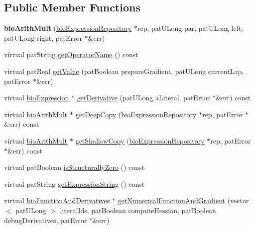 \subsection*{Public Member Functions}
\begin{DoxyCompactItemize}
\item 
\mbox{\label{classbio_arith_mult_ac3da725646bfbd4e8de4332e2d06445e}} 
{\bfseries bio\+Arith\+Mult} (\hyperlink{classbio_expression_repository}{bio\+Expression\+Repository} $\ast$rep, pat\+U\+Long par, pat\+U\+Long left, pat\+U\+Long right, pat\+Error $\ast$\&err)
\item 
virtual pat\+String \hyperlink{classbio_arith_mult_aff182437fd5a1259cbc79fc7f8bc4956}{get\+Operator\+Name} () const
\item 
virtual pat\+Real \hyperlink{classbio_arith_mult_a5f0d4c6fe299be5b88cbcab100def6c9}{get\+Value} (pat\+Boolean prepare\+Gradient, pat\+U\+Long current\+Lap, pat\+Error $\ast$\&err)
\item 
virtual \hyperlink{classbio_expression}{bio\+Expression} $\ast$ \hyperlink{classbio_arith_mult_a77183d650695b163328878a88fcb02a7}{get\+Derivative} (pat\+U\+Long a\+Literal, pat\+Error $\ast$\&err) const
\item 
virtual \hyperlink{classbio_arith_mult}{bio\+Arith\+Mult} $\ast$ \hyperlink{classbio_arith_mult_a1b6b5a5ce5e104bf5a69010ad67ecd11}{get\+Deep\+Copy} (\hyperlink{classbio_expression_repository}{bio\+Expression\+Repository} $\ast$rep, pat\+Error $\ast$\&err) const
\item 
virtual \hyperlink{classbio_arith_mult}{bio\+Arith\+Mult} $\ast$ \hyperlink{classbio_arith_mult_a58d1f8dec3f450d17bbdfe4f98b18c19}{get\+Shallow\+Copy} (\hyperlink{classbio_expression_repository}{bio\+Expression\+Repository} $\ast$rep, pat\+Error $\ast$\&err) const
\item 
virtual pat\+Boolean \hyperlink{classbio_arith_mult_aedfa0cf623dde749da1760ad7fd9e326}{is\+Structurally\+Zero} () const
\item 
virtual pat\+String \hyperlink{classbio_arith_mult_a7a19012c1cfe783b75de9a9c961587c2}{get\+Expression\+String} () const
\item 
virtual \hyperlink{classbio_function_and_derivatives}{bio\+Function\+And\+Derivatives} $\ast$ \hyperlink{classbio_arith_mult_a18612adf78adad46a0a19f2a57c4b32d}{get\+Numerical\+Function\+And\+Gradient} (vector$<$ pat\+U\+Long $>$ literal\+Ids, pat\+Boolean compute\+Hessian, pat\+Boolean debug\+Derivatives, pat\+Error $\ast$\&err)
\end{DoxyCompactItemize}
